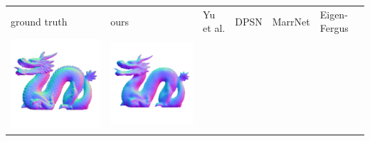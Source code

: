 \begin{tabularx}{\linewidth}{@{}Y@{}Y@{}Y@{}Y@{}Y@{}Y@{}}
ground truth & ours & Yu et al. & DPSN & MarrNet & Eigen-Fergus \\
\includegraphics[width=\linewidth]{semisynthetic/20150514_21_gt.png} &
\includegraphics[width=\linewidth]{semisynthetic/20150514_21_ours_out.png} &

\end{tabularx}
